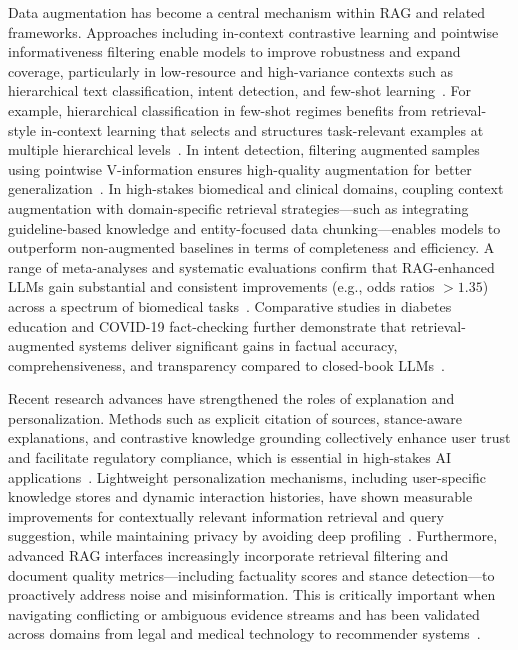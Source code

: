 \documentclass[sigconf]{acmart}
\begin{document}
Data augmentation has become a central mechanism within RAG and related frameworks. Approaches including in-context contrastive learning and pointwise informativeness filtering enable models to improve robustness and expand coverage, particularly in low-resource and high-variance contexts such as hierarchical text classification, intent detection, and few-shot learning~\cite{ref8,ref10,ref16,ref19,ref26,ref29,ref35,ref47,ref55,ref63}. For example, hierarchical classification in few-shot regimes benefits from retrieval-style in-context learning that selects and structures task-relevant examples at multiple hierarchical levels~\cite{ref16}. In intent detection, filtering augmented samples using pointwise V-information ensures high-quality augmentation for better generalization~\cite{ref61}. In high-stakes biomedical and clinical domains, coupling context augmentation with domain-specific retrieval strategies—such as integrating guideline-based knowledge and entity-focused data chunking—enables models to outperform non-augmented baselines in terms of completeness and efficiency. A range of meta-analyses and systematic evaluations confirm that RAG-enhanced LLMs gain substantial and consistent improvements (e.g., odds ratios $>1.35$) across a spectrum of biomedical tasks~\cite{ref8}. Comparative studies in diabetes education and COVID-19 fact-checking further demonstrate that retrieval-augmented systems deliver significant gains in factual accuracy, comprehensiveness, and transparency compared to closed-book LLMs~\cite{ref54,ref55}.

Recent research advances have strengthened the roles of explanation and personalization. Methods such as explicit citation of sources, stance-aware explanations, and contrastive knowledge grounding collectively enhance user trust and facilitate regulatory compliance, which is essential in high-stakes AI applications~\cite{ref17,ref43,ref46,ref54,ref62}. Lightweight personalization mechanisms, including user-specific knowledge stores and dynamic interaction histories, have shown measurable improvements for contextually relevant information retrieval and query suggestion, while maintaining privacy by avoiding deep profiling~\cite{ref23,ref36,ref45,ref48}. Furthermore, advanced RAG interfaces increasingly incorporate retrieval filtering and document quality metrics—including factuality scores and stance detection—to proactively address noise and misinformation. This is critically important when navigating conflicting or ambiguous evidence streams and has been validated across domains from legal and medical technology to recommender systems~\cite{ref21,ref22,ref28,ref32,ref42,ref46,ref50,ref52,ref63}.
\end{document}
